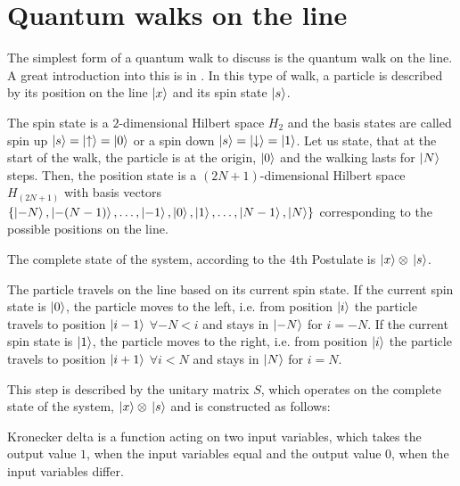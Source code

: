 \section{Quantum walks on the line}


The simplest form of a quantum walk to discuss is the quantum walk on the line. A great introduction into this is in \cite{KempeIntroduction}. In this type of walk, a particle is described by its position on the line $\ket{x}$ and its spin state $\ket{s}$.

The spin state is a $2$-dimensional Hilbert space $H_2$ and the basis states are called spin up $\ket{s} = \ket{\uparrow} = \ket{0}$ or a spin down $\ket{s} = \ket{\downarrow} = \ket{1}$. Let us state, that at the start of the walk, the particle is at the origin, $\ket{0}$ and the walking lasts for $\ket{N}$ steps. Then, the position state is a $(2N+1)$-dimensional Hilbert space $H_{(2N+1)}$ with basis vectors $\{\ket{-N},\ket{-(N-1)},\dots,\ket{-1},\ket{0},\ket{1},\dots,\ket{N-1},\ket{N}\}$ corresponding to the possible positions on the line.


The complete state of the system, according to the 4th Postulate is $\ket{x}\otimes{}\ket{s}$.

The particle travels on the line based on its current spin state. If the current spin state is $\ket{0}$, the particle moves to the left, i.e. from position $\ket{i}$ the particle travels to position $\ket{i-1}$ $\forall -N < i$ and stays in $\ket{-N}$ for $i=-N$. If the current spin state is $\ket{1}$, the particle moves to the right, i.e. from position $\ket{i}$ the particle travels to position $\ket{i+1}$ $\forall i<N$ and stays in $\ket{N}$ for $i=N$.

This step is described by the unitary matrix $S$, which operates on the complete state of the system, $\ket{x}\otimes{}\ket{s}$ and is constructed as follows:


 Kronecker delta is a function acting on two input variables, which takes the output value $1$, when the input variables equal and the output value $0$, when the input variables differ.

